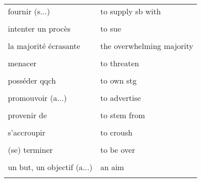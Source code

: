 \documentclass[
  10pt,
]{article}
\begin{document}
\begin{longtable}{ll}
fournir (s...) & to supply sb with\\

\cellcolor{gray!6}{incliner} & \cellcolor{gray!6}{to tilt}\\

intenter un procès & to sue\\

\cellcolor{gray!6}{interdire} & \cellcolor{gray!6}{to ban}\\

la majorité écrasante & the overwhelming majority\\

\cellcolor{gray!6}{le confinement} & \cellcolor{gray!6}{the lockdown}\\

menacer & to threaten\\

\cellcolor{gray!6}{pendant que} & \cellcolor{gray!6}{while}\\

posséder qqch & to own stg\\

\cellcolor{gray!6}{postuler à qqch} & \cellcolor{gray!6}{to apply for stg}\\

promouvoir (a...) & to advertise\\

\cellcolor{gray!6}{promouvoir (p...)} & \cellcolor{gray!6}{to promote}\\

provenir de & to stem from\\

\cellcolor{gray!6}{résoudre} & \cellcolor{gray!6}{to work out}\\

s'accroupir & to croush\\

\cellcolor{gray!6}{selon, d'après} & \cellcolor{gray!6}{according to}\\

(se) terminer & to be over\\

\cellcolor{gray!6}{sonder} & \cellcolor{gray!6}{to probe}\\

un but, un objectif (a...) & an aim\\

\cellcolor{gray!6}{un but, un objectif (p...)} & \cellcolor{gray!6}{a purpose}\\


\end{longtable}
\end{document}
